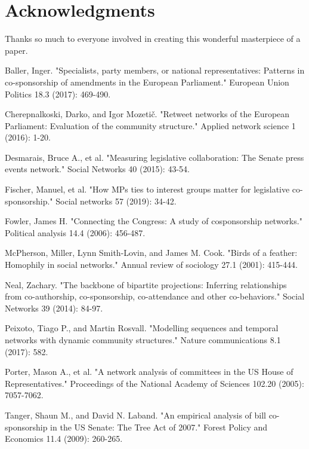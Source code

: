 \documentclass[lettersize,journal]{IEEEtran}
\begin{document}

\section*{Acknowledgments}

Thanks so much to everyone involved in creating this wonderful masterpiece of a paper.

\begin{thebibliography}{1}


Baller, Inger. "Specialists, party members, or national representatives: Patterns in co-sponsorship of amendments in the European Parliament." European Union Politics 18.3 (2017): 469-490.

Cherepnalkoski, Darko, and Igor Mozetič. "Retweet networks of the European Parliament: Evaluation of the community structure." Applied network science 1 (2016): 1-20.


Desmarais, Bruce A., et al. "Measuring legislative collaboration: The Senate press events network." Social Networks 40 (2015): 43-54.

Fischer, Manuel, et al. "How MPs ties to interest groups matter for legislative co-sponsorship." Social networks 57 (2019): 34-42.

Fowler, James H. "Connecting the Congress: A study of cosponsorship networks." Political analysis 14.4 (2006): 456-487.

McPherson, Miller, Lynn Smith-Lovin, and James M. Cook. "Birds of a feather: Homophily in social networks." Annual review of sociology 27.1 (2001): 415-444.

Neal, Zachary. "The backbone of bipartite projections: Inferring relationships from co-authorship, co-sponsorship, co-attendance and other co-behaviors." Social Networks 39 (2014): 84-97.

Peixoto, Tiago P., and Martin Rosvall. "Modelling sequences and temporal networks with dynamic community structures." Nature communications 8.1 (2017): 582.

Porter, Mason A., et al. "A network analysis of committees in the US House of Representatives." Proceedings of the National Academy of Sciences 102.20 (2005): 7057-7062.

Tanger, Shaun M., and David N. Laband. "An empirical analysis of bill co-sponsorship in the US Senate: The Tree Act of 2007." Forest Policy and Economics 11.4 (2009): 260-265.

\end{thebibliography}


\vfill
\end{document}
